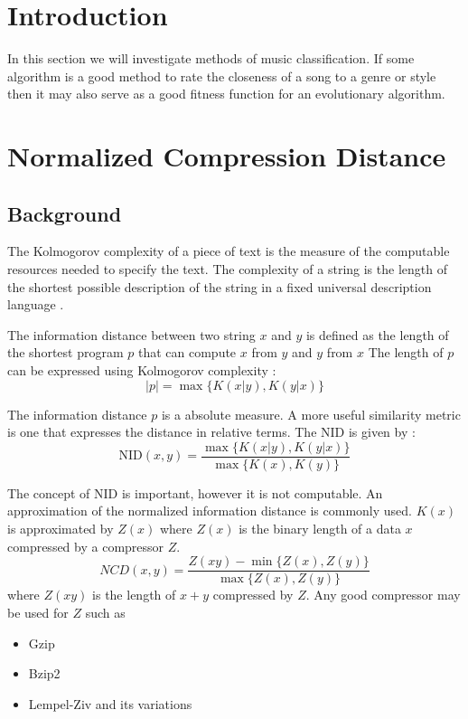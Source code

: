 \section{Introduction}
In this section we will investigate methods of music classification. If some algorithm is a good method to rate the closeness of a song to a genre or style then it may also serve as a good fitness function for an evolutionary algorithm.


\section{Normalized Compression Distance} \label{sec:class_ncd}
\subsection{Background}
The Kolmogorov complexity of a piece of text is the measure of the computable resources needed to specify the text. The complexity of a string is the length of the shortest possible description of the string in a fixed universal description language \cite{Kolmogorov1998387}.

The information distance between two string $x$ and $y$ is defined as the length of the shortest program $p$ that can compute $x$ from $y$ and $y$ from $x$
The length of $p$ can be expressed using Kolmogorov complexity \cite{681318}:
\[ |p| = \max\{K(x|y), K(y|x)\}  \]

The information distance $p$ is a absolute measure. A more useful similarity metric is one that expresses the distance in relative terms. 
The \ac{NID} is given by \cite{1362909} : 
\[ \text{NID}(x,y) = \frac{\max\{K(x|y),K(y|x)\}}{\max\{K(x),K(y)\}} \]

The concept of \ac{NID} is important, however it is not computable. 
An approximation of the normalized information distance is commonly used.  $K(x)$ is approximated by $Z(x)$ where $Z(x)$ is the binary length of a data $x$ compressed by a compressor $Z$.
\[NCD(x,y) = \frac{Z(xy) - \min\{ Z(x), Z(y) \}}{\max\{ Z(x), Z(y) \}} \]
where $Z(xy)$ is the length of $x+y$ compressed by $Z$. 
Any good compressor may be used for $Z$ such as 
\begin{itemize}
\item Gzip
\item Bzip2
\item Lempel-Ziv and its variations
\end{itemize}
